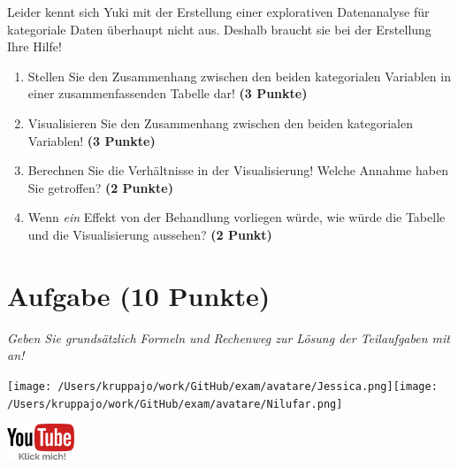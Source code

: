 \documentclass[a4paper, 9pt]{scrartcl}\usepackage[]{graphicx}\usepackage[]{xcolor}
\begin{document}
\vspace{2Ex}

Leider kennt sich Yuki mit der Erstellung einer explorativen Datenanalyse für kategoriale Daten überhaupt nicht aus. Deshalb braucht sie bei der Erstellung Ihre Hilfe!

\begin{enumerate}
\item Stellen Sie den Zusammenhang zwischen den beiden kategorialen Variablen in einer zusammenfassenden Tabelle dar! \textbf{(3 Punkte)}
\item Visualisieren Sie den Zusammenhang zwischen den beiden kategorialen Variablen! \textbf{(3 Punkte)}
\item Berechnen Sie die Verhältnisse in der Visualisierung! Welche Annahme haben Sie getroffen? \textbf{(2 Punkte)}
\item Wenn \textit{ein} Effekt von der Behandlung vorliegen würde, wie würde die Tabelle und die Visualisierung aussehen? \textbf{(2 Punkt)}
\end{enumerate} 
\clearpage

\section{Aufgabe \hfill (10 Punkte)}

\textit{Geben Sie grundsätzlich Formeln und Rechenweg zur Lösung der Teilaufgaben mit an!} \\[1Ex]
 

 
\begin{minipage}[t]{0.5\textwidth}
\texttt{[image: /Users/kruppajo/work/GitHub/exam/avatare/Jessica.png]}\hspace{-4mm}\texttt{[image: /Users/kruppajo/work/GitHub/exam/avatare/Nilufar.png]}
\end{minipage}
\begin{minipage}[t]{0.5\textwidth}
\hfill
\href{https://youtu.be/Op-gjzASH9I}{\includegraphics[width = 2cm]{img/youtube}}
\end{minipage}
\end{document}
